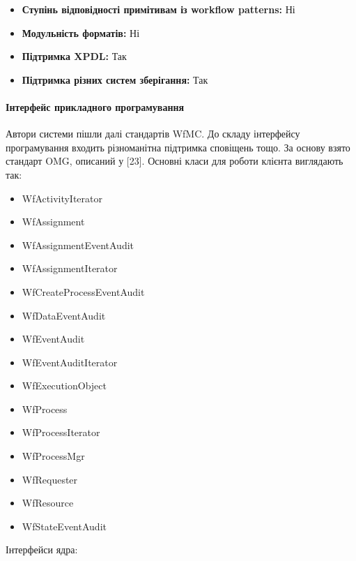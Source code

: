 \documentclass{memoir}
\begin{document}
\begin{itemize}
    \item \textbf{Ступінь відповідності примітивам із workflow patterns:} Ні
    \item \textbf{Модульність форматів:} Ні
    \item \textbf{Підтримка XPDL:} Так
    \item \textbf{Підтримка різних систем зберігання:} Так
\end{itemize}

\paragraph{Інтерфейс прикладного програмування}

Автори системи пішли далі стандартів WfMC. До складу інтерфейсу програмування входить різноманітна підтримка сповіщень тощо. За основу взято стандарт OMG, описаний у [23]. Основні класи для роботи клієнта виглядають так:

\begin{itemize}
    \item WfActivityIterator
    \item WfAssignment
    \item WfAssignmentEventAudit
    \item WfAssignmentIterator
    \item WfCreateProcessEventAudit
    \item WfDataEventAudit
    \item WfEventAudit
    \item WfEventAuditIterator
    \item WfExecutionObject
    \item WfProcess
    \item WfProcessIterator
    \item WfProcessMgr
    \item WfRequester
    \item WfResource
    \item WfStateEventAudit
\end{itemize}

Інтерфейси ядра:
\end{document}
